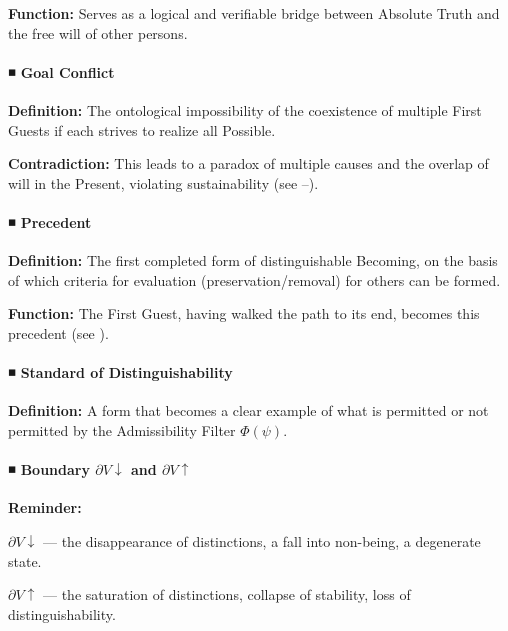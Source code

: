 \documentclass[12pt]{article}
\begin{document}
\textbf{Function:} Serves as a logical and verifiable bridge between Absolute Truth and the free will of other persons.

\bigskip

\paragraph{◾ Goal Conflict}

\textbf{Definition:} The ontological impossibility of the coexistence of multiple First Guests if each strives to realize all Possible.

\textbf{Contradiction:} This leads to a paradox of multiple causes and the overlap of will in the Present, violating sustainability (see \text{[11.1]}–\text{[11.3]}).

\bigskip

\paragraph{◾ Precedent}

\textbf{Definition:} The first completed form of distinguishable Becoming, on the basis of which criteria for evaluation (preservation/removal) for others can be formed.

\textbf{Function:} The First Guest, having walked the path to its end, becomes this precedent (see \text{[11.10–11.12]}).

\bigskip

\paragraph{◾ Standard of Distinguishability}

\textbf{Definition:} A form that becomes a clear example of what is permitted or not permitted by the Admissibility Filter $\Phi(\psi)$.

\bigskip

\paragraph{◾ Boundary $\partial V \downarrow$ and $\partial V \uparrow$}

\textbf{Reminder:}

$\partial V \downarrow$ — the disappearance of distinctions, a fall into non-being, a degenerate state.

$\partial V \uparrow$ — the saturation of distinctions, collapse of stability, loss of distinguishability.
\end{document}
